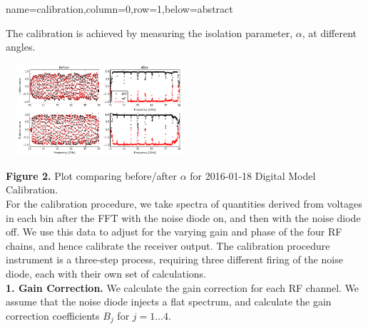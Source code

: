 \documentclass[a0paper,portrait]{baposter}
\begin{document}
\begin{poster}
{}
{name=calibration,column=0,row=1,below=abstract}
{\small{The calibration is achieved by measuring the isolation parameter, $\alpha$, at different angles.}
\begin{center}
\includegraphics [height=34mm, width=70mm] {Final_alpha_20170118.png}
\end{center}
\small{\textbf{Figure 2.} Plot comparing before/after $\alpha$ for 2016-01-18 Digital Model Calibration.\\
For the calibration procedure, we take spectra of quantities derived from voltages in each bin after the FFT with the noise diode on, and then with the noise diode off. We use this data to adjust for the varying gain and phase of the four RF chains, and hence calibrate the receiver output. The calibration procedure instrument is a three-step process, requiring three different firing of the noise diode, each with their own set of calculations.\\
\textbf{1. Gain Correction.} We calculate the gain correction for each RF channel. We assume that the noise diode injects a flat spectrum, and calculate the gain correction coefficients $B_{j}$ for $j=1...4$.}
}
\end{poster}
\end{document}
